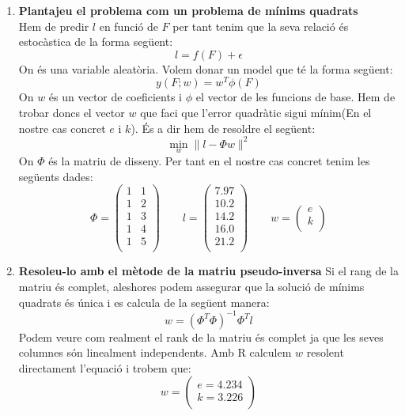 \documentclass[a4paper]{article}
\begin{document}
\begin{enumerate}
	\item\textbf{Plantajeu el problema com un problema de mínims quadrats} \\
	Hem de predir $l$ en funció de $F$ per tant tenim que la seva relació és estocàstica de la forma següent:
	$$
	l = f(F) + \epsilon
	$$
	On \epsilon és una variable aleatòria. Volem donar un model que té la forma següent:
	$$
	y(F;w) = w^T  \phi(F)
	$$
	On $w$ és un vector de coeficients i $\phi$ el vector de les funcions de base. Hem de trobar doncs el vector $w$ que faci que l'error quadràtic sigui mínim(En el nostre cas concret $e$ i $k$). És a dir hem de resoldre el següent:
	$$
	\min_{w} \parallel l - \Phi w \parallel ^2
	$$
	On $\Phi$ és la matriu de disseny. Per tant en el nostre cas concret tenim les següents dades:
	$$
	\Phi = 
	\begin{pmatrix}
	1 & 1 \\
	1 & 2 \\
	1 & 3 \\
	1 & 4 \\
	1 & 5 \\
	\end{pmatrix}
	\qquad
	l =
	\begin{pmatrix}
	7.97 \\
	10.2 \\
	14.2 \\
	16.0 \\
	21.2 \\
	\end{pmatrix}
	\qquad
	w =
	\begin{pmatrix}
	e \\
	k \\
	\end{pmatrix}
	$$
	\newpage
	\item\textbf{Resoleu-lo amb el mètode de la matriu pseudo-inversa}
	Si el rang de la matriu és complet, aleshores podem assegurar que la solució de mínims quadrats és única i es calcula de la següent manera:
	$$
	w = (\Phi^T\Phi)^{-1}\Phi^Tl
	$$
	Podem veure com realment el rank de la matriu és complet ja que les seves columnes són linealment independents. Amb R calculem $w$ resolent directament l'equació i trobem que:
	$$
	w=
	\begin{pmatrix}
	e=4.234\\
	k=3.226\\
	\end{pmatrix}
	$$
	\begin{figure}[H]
		\centering

\end{figure}
\end{enumerate}
\end{document}
